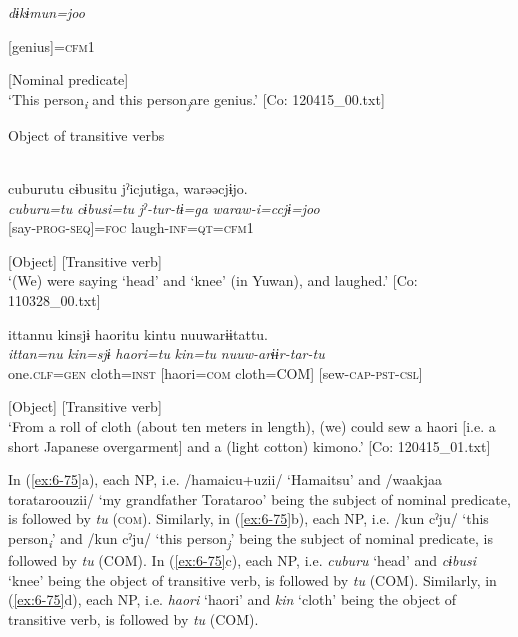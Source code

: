 \begin{table}
      \textit{dɨkɨmun=joo}

      [genius]=\textsc{cfm}1

      [Nominal predicate]\\
\glt ‘This person\textit{\textsubscript{i}} and this person\textit{\textsubscript{j}}are genius.’ [Co: 120415\_00.txt]
\z

  Object of transitive verbs

\ex{}\\
{\TM}
\glll  cuburutu  cɨbusitu  jˀicjutɨga,  warəəcjɨjo.\\
\textit{cuburu=tu}  \textit{cɨbusi=tu}  \textit{jˀ-tur-tɨ=ga}  \textit{waraw-i=ccjɨ=joo}\\
[head=\textsc{com}  knee=COM]  [say-\textsc{prog}-\textsc{seq}]=\textsc{foc}  laugh-\textsc{inf}=\textsc{qt}=\textsc{cfm}1

      [Object]  [Transitive verb]  \\
\glt ‘(We) were saying ‘head’ and ‘knee’ (in Yuwan), and laughed.’ [Co: 110328\_00.txt]
\z

\ex {\TM}  ittannu  kinsjɨ  {\textbar}haori{\textbar}tu  kintu  nuuwarɨɨtattu.\\
\glll \textit{ittan=nu}  \textit{kin=sjɨ}  \textit{haori=tu}  \textit{kin=tu}  \textit{nuuw-arɨɨr-tar-tu}\\
one.\textsc{clf}=\textsc{gen}  cloth=\textsc{inst}  [haori=\textsc{com}  cloth=COM]  [sew-\textsc{cap}-\textsc{pst}-\textsc{csl}]

          [Object]  [Transitive verb]\\
\glt ‘From a roll of cloth (about ten meters in length), (we) could sew a haori [i.e. a short Japanese overgarment] and a (light cotton) kimono.’ [Co: 120415\_01.txt]
\z

In (\ref{ex:6-75}a), each NP, i.e. /hamaicu+uzii/ ‘Hamaitsu’ and /waakjaa torataroouzii/ ‘my grandfather Torataroo’ being the subject of nominal predicate, is followed by \textit{tu} (\textsc{com}). Similarly, in (\ref{ex:6-75}b), each NP, i.e. /kun cˀju/ ‘this person\textit{\textsubscript{i}}’ and /kun cˀju/ ‘this person\textit{\textsubscript{j}}’ being the subject of nominal predicate, is followed by \textit{tu} (COM). In (\ref{ex:6-75}c), each NP, i.e. \textit{cuburu} ‘head’ and \textit{cɨbusi} ‘knee’ being the object of transitive verb, is followed by \textit{tu} (COM). Similarly, in (\ref{ex:6-75}d), each NP, i.e. \textit{haori} ‘haori’ and \textit{kin} ‘cloth’ being the object of transitive verb, is followed by \textit{tu} (COM).


\end{table}
